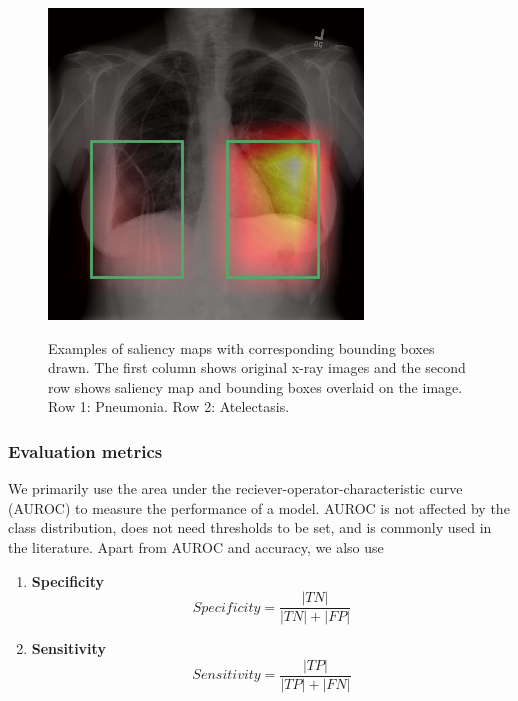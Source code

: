 \documentclass[8pt]{beamer}
\begin{document}
\begin{frame}
\begin{figure}
          \includegraphics[height=0.4\textheight]{images/atelectasis_hm_bbox}\\[0.01\textwidth]
          \caption{Examples of saliency maps with corresponding bounding boxes
            drawn. The first column shows original x-ray images and the second
            row shows saliency map and bounding boxes overlaid on the image. Row
            1: Pneumonia. Row 2: Atelectasis.}
          \label{cam_bbox_examples}
        \end{figure}


      \end{frame}

      \begin{frame}

        \frametitle{Evaluation metrics}

        We primarily use the area under the reciever-operator-characteristic
        curve (AUROC) to measure the performance of a model. AUROC is not
        affected by the class distribution, does not need thresholds to be set,
        and is commonly used in the literature. Apart from AUROC and accuracy,
        we also use \\ \pause

        \vspace{\baselineskip}

        \begin{enumerate}
        \item{\textbf{Specificity}\\
            \begin{equation}
              Specificity = \frac{|TN|}{|TN| + |FP|}
            \end{equation}
          }
        \item{\textbf{Sensitivity}\\
            \begin{equation}
              Sensitivity = \frac{|TP|}{|TP| + |FN|}
            \end{equation}
          }
        \end{enumerate}

      \end{frame}
\end{document}

